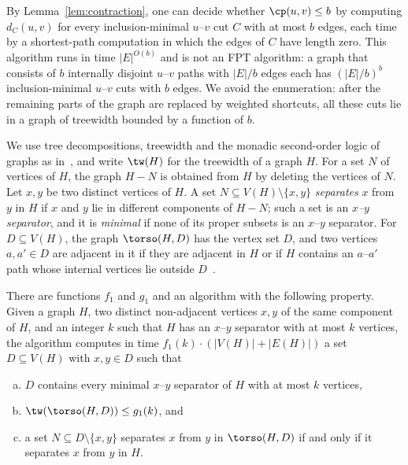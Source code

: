 By Lemma~\ref{lem:contraction}, one can decide whether $\cp(u,v) \leq b$ by computing $d_C(u,v)$ for every inclusion-minimal $u$--$v$ cut $C$ with at most $b$ edges, each time by a shortest-path computation in which the edges of $C$ have length zero.
This algorithm runs in time $|E|^{O(b)}$ and is not an FPT algorithm: a graph that consists of $b$ internally disjoint $u$--$v$ paths with $|E|/b$ edges each has $(|E|/b)^b$ inclusion-minimal $u$--$v$ cuts with $b$ edges.
We avoid the enumeration: after the remaining parts of the graph are replaced by weighted shortcuts, all these cuts lie in a graph of treewidth bounded by a function of $b$.

We use tree decompositions, treewidth and the monadic second-order logic of graphs as in~\cite[Section~2.1]{Marx2013Separators}, and write $\tw(H)$ for the treewidth of a graph $H$.
For a set $N$ of vertices of $H$, the graph $H - N$ is obtained from $H$ by deleting the vertices of $N$.
Let $x, y$ be two distinct vertices of $H$.
A set $N \subseteq V(H) \setminus \{x, y\}$ \emph{separates} $x$ from $y$ in $H$ if $x$ and $y$ lie in different components of $H - N$; such a set is an \emph{$x$--$y$ separator}, and it is \emph{minimal} if none of its proper subsets is an $x$--$y$ separator.
For $D \subseteq V(H)$, the graph $\torso(H, D)$ has the vertex set $D$, and two vertices $a, a' \in D$ are adjacent in it if they are adjacent in $H$ or if $H$ contains an $a$--$a'$ path whose internal vertices lie outside $D$~\cite[Definition~2.5]{Marx2013Separators}.

\begin{lemma}
\label{lem:treewidth-reduction}
There are functions $f_1$ and $g_1$ and an algorithm with the following property.
Given a graph $H$, two distinct non-adjacent vertices $x, y$ of the same component of $H$, and an integer $k$ such that $H$ has an $x$--$y$ separator with at most $k$ vertices, the algorithm computes in time $f_1(k) \cdot (|V(H)| + |E(H)|)$ a set $D \subseteq V(H)$ with $x, y \in D$ such that
\begin{enumerate}[(a)]
    \item $D$ contains every minimal $x$--$y$ separator of $H$ with at most $k$ vertices,
    \item $\tw(\torso(H, D)) \leq g_1(k)$, and
    \item a set $N \subseteq D \setminus \{x, y\}$ separates $x$ from $y$ in $\torso(H, D)$ if and only if it separates $x$ from $y$ in $H$.
\end{enumerate}
\end{lemma}

